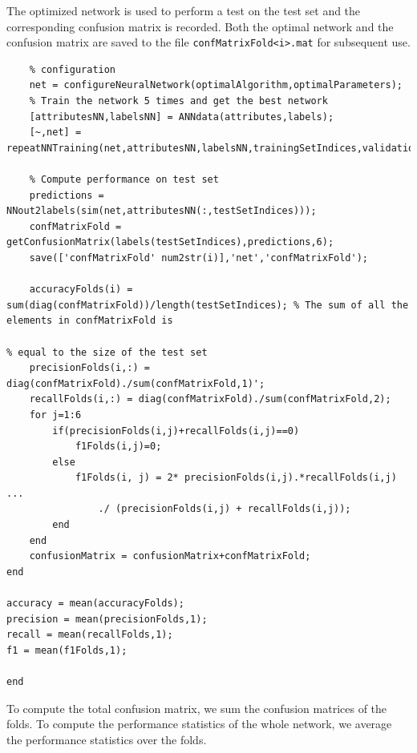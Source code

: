 \documentclass{article}
\begin{document}
The optimized network is used to perform a test on the test set and the corresponding confusion matrix is recorded. Both the optimal network and the confusion matrix are saved to the file \verb$confMatrixFold<i>.mat$ for subsequent use.
\begin{lstlisting}[firstnumber=57,breaklines=true]
    % Configure the best training algorithm with the optimal parameter
    % configuration
    net = configureNeuralNetwork(optimalAlgorithm,optimalParameters);
    % Train the network 5 times and get the best network
    [attributesNN,labelsNN] = ANNdata(attributes,labels);
    [~,net] = repeatNNTraining(net,attributesNN,labelsNN,trainingSetIndices,validationSetIndices);
    
    % Compute performance on test set
    predictions = NNout2labels(sim(net,attributesNN(:,testSetIndices)));
    confMatrixFold = getConfusionMatrix(labels(testSetIndices),predictions,6);
    save(['confMatrixFold' num2str(i)],'net','confMatrixFold');
    
    accuracyFolds(i) = sum(diag(confMatrixFold))/length(testSetIndices); % The sum of all the elements in confMatrixFold is
                                                                         % equal to the size of the test set
    precisionFolds(i,:) = diag(confMatrixFold)./sum(confMatrixFold,1)';
    recallFolds(i,:) = diag(confMatrixFold)./sum(confMatrixFold,2);
    for j=1:6
        if(precisionFolds(i,j)+recallFolds(i,j)==0)
            f1Folds(i,j)=0;
        else
            f1Folds(i, j) = 2* precisionFolds(i,j).*recallFolds(i,j) ...
                ./ (precisionFolds(i,j) + recallFolds(i,j));
        end
    end
    confusionMatrix = confusionMatrix+confMatrixFold;
end
    
accuracy = mean(accuracyFolds);
precision = mean(precisionFolds,1);
recall = mean(recallFolds,1);
f1 = mean(f1Folds,1); 
            
end
\end{lstlisting}

To compute the total confusion matrix, we sum the confusion matrices of the folds. To compute the performance statistics of the whole network, we average the performance statistics over the folds.
\end{document}
